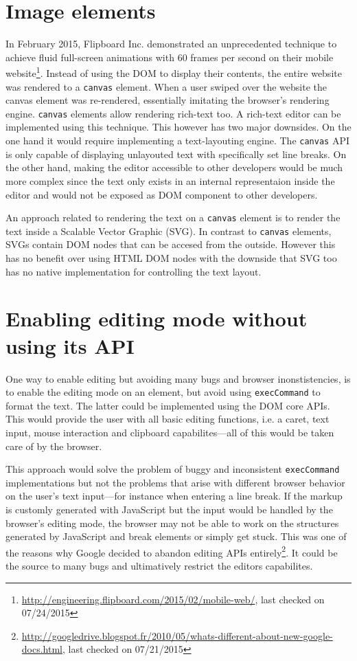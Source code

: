 \section{Image elements} In February 2015, Flipboard Inc. demonstrated an unprecedented technique to achieve fluid full-screen animations with 60 frames per second on their mobile website\footnote{\url{http://engineering.flipboard.com/2015/02/mobile-web/}, last checked on 07/24/2015}. Instead of using the DOM to display their contents, the entire website was rendered to a \texttt{canvas} element. When a user swiped over the website the canvas element was re-rendered, essentially imitating the browser's rendering engine. \texttt{canvas} elements allow rendering rich-text too. A rich-text editor can be implemented using this technique. This however has two major downsides. On the one hand it would require implementing a text-layouting engine. The \texttt{canvas} API is only capable of displaying unlayouted text with specifically set line breaks. On the other hand, making the editor accessible to other developers would be much more complex since the text only exists in an internal representaion inside the editor and would not be exposed as DOM component to other developers.

An approach related to rendering the text on a \texttt{canvas} element is to render the text inside a Scalable Vector Graphic (SVG). In contrast to \texttt{canvas} elements, SVGs contain DOM nodes that can be accesed from the outside. However this has no benefit over using HTML DOM nodes with the downside that SVG too has no native implementation for controlling the text layout.

\section{Enabling editing mode without using its API} One way to enable editing but avoiding many bugs and browser inonstistencies, is to enable the editing mode on an element, but avoid using \texttt{execCommand} to format the text. The latter could be implemented using the DOM core APIs. This would provide the user with all basic editing functions, i.e. a caret, text input, mouse interaction and clipboard capabilites---all of this would be taken care of by the browser.

This approach would solve the problem of buggy and inconsistent \texttt{execCommand} implementations but not the problems that arise with different browser behavior on the user's text input---for instance when entering a line break. If the markup is customly generated with JavaScript but the input would be handled by the browser's editing mode, the browser may not be able to work on the structures generated by JavaScript and break elements or simply get stuck. This was one of the reasons why Google decided to abandon editing APIs entirely\footnote{\url{http://googledrive.blogspot.fr/2010/05/whats-different-about-new-google-docs.html}, last checked on 07/21/2015}. It could be the source to many bugs and ultimatively restrict the editors capabilites.

